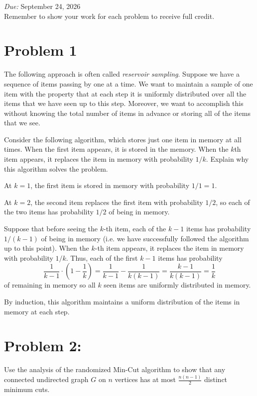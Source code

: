\documentclass[12pt,letterpaper]{article}
\newcommand{\DUEDATE}{September 24, 2026}
\begin{document}
\begin{center}
    \vspace{10pt}
    \textit{Due:} \DUEDATE\\
    Remember to show your work for each problem to receive full credit.
\end{center}
\section*{Problem 1}

The following approach is often called \textit{reservoir sampling}.  Suppose we have a sequence of items passing by one at a time.  We want to maintain a sample of one item with the property that at each step it is uniformly distributed over all the items that we have seen up to this step.  Moreover, we want to accomplish this without knowing the total number of items in advance or storing all of the items that we see.

Consider the following algorithm, which stores just one item in memory at all times.  When the first item appears, it is stored in the memory.  When the $k$th item appears, it replaces the item in memory with probability $1/k$.  Explain why this algorithm solves the problem.

\color{darkblue}
    At $k = 1$, the first item is stored in memory with probability $1/1 = 1$.  
    
    At $k = 2$, the second item replaces the first item with probability $1/2$, so each of the two items has probability $1/2$ of being in memory.  
    
    Suppose that before seeing the $k$-th item, each of the $k-1$ items has probability $1/(k-1)$ of being in memory (i.e. we have successfully followed the algorithm up to this point). When the $k$-th item appears, it replaces the item in memory with probability $1/k$. Thus, each of the first $k-1$ items has probability 
    \[\frac{1}{k-1} \cdot \left(1 - \frac{1}{k}\right) = \frac{1}{k-1} - \frac{1}{k(k-1)} = \frac{k-1}{k(k-1)} = \frac{1}{k}\]
    of remaining in memory so all $k$ seen items are uniformly distributed in memory.  
    
    By induction, this algorithm maintains a uniform distribution of the items in memory at each step.
\color{black}


\section*{Problem 2:}
Use the analysis of the randomized Min-Cut algorithm to
show that any connected undirected graph $G$ on $n$ vertices has at most $\frac{n(n-1)}{2}$ distinct minimum cuts.
\end{document}
